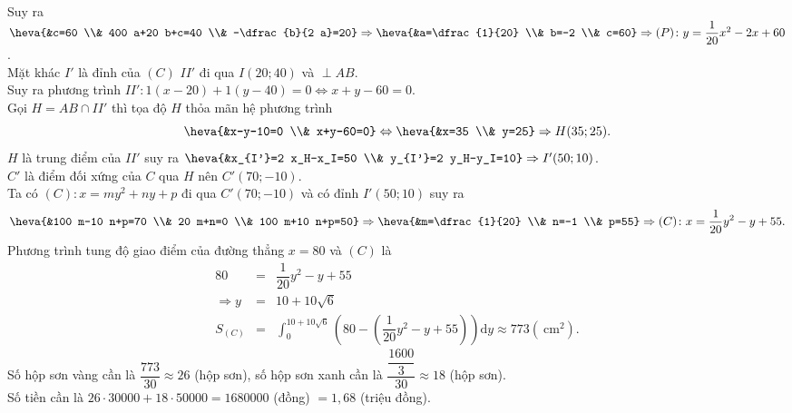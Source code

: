 \begin{bt}
{		Suy ra $\heva{&c=60 \\& 400 a+20 b+c=40 \\& -\dfrac{b}{2 a}=20} \Rightarrow\heva{&a=\dfrac{1}{20} \\& b=-2 \\& c=60}\Rightarrow(P)\colon y=\dfrac{1}{20} x^2-2 x+60$.\\  Mặt khác
		$I'$ là  đỉnh của $(C)$
		$I I'$ đi  qua $I(20; 40)$ và $\perp AB$.
		\\Suy ra phương trình $I I'\colon  1(x-20)+1(y-40)=0 \Leftrightarrow x+y-60=0$.\\
		 Gọi $H=AB \cap I I'$ thì tọa độ $H$ thỏa mãn hệ phương trình
		$$\heva{&x-y-10=0 \\& x+y-60=0} \Leftrightarrow\heva{&x=35 \\&  y=25} \Rightarrow H(35; 25).$$
		$H$ là trung điểm của $I I'$ suy ra $\heva{&x_{I'}=2 x_H-x_I=50 \\& y_{I'}=2  y_H-y_I=10} \Rightarrow I'(50; 10)$.\\
		$C'$ là điểm đối xứng của  $C$ qua $H$ nên $C'(70;-10)$.\\
		Ta có $(C)\colon x=m y^2+n  y+p$ đi qua $C'(70;-10)$ và có đỉnh $I'(50; 10)$ suy ra
		$$\heva{&100 m-10  n+p=70 \\& 20 m+n=0 \\& 100 m+10 n+p=50} \Rightarrow\heva{&m=\dfrac{1}{20} \\& n=-1 \\& p=55}\Rightarrow (C)\colon x=\dfrac{1}{20} y^2-y+55.$$
		Phương trình tung độ giao điểm của đường thẳng $x=80$ và $(C)$ là 
		 \allowdisplaybreaks
		\begin{eqnarray*}
			80&=&\dfrac{1}{20} y^2-y+55 \\\Rightarrow  y&=&10+10 \sqrt{6}\\
			S_{(C)}&=&\displaystyle\int_{0}^{10+10 \sqrt{6}}\left(80-\left(\dfrac{1}{20} y^2-y+55\right)\right) \mathrm{d} y \approx 773\left(\mathrm{~cm}^2\right). 
		\end{eqnarray*}
		Số hộp sơn vàng cần là $\dfrac{773}{30} \approx 26$ (hộp sơn), số hộp sơn xanh cần là  $\dfrac{\dfrac{1600}{3}}{30} \approx 18$ (hộp sơn).\\
		Số tiền cần là 
		$26 \cdot  30000+18 \cdot 50000=1680000$ (đồng) $=1{,}68$ (triệu đồng).
	 }
\end{bt}

